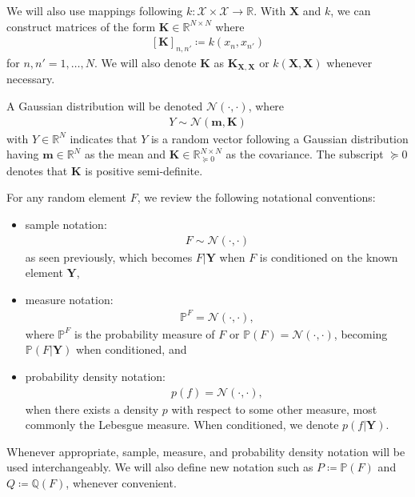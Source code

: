 \documentclass{article}
\numberwithin{equation}{section}
\begin{document}
We will also use mappings following $k: \mathcal{X} \times \mathcal{X} \rightarrow \mathbb{R}$.
With $\mathbf{X}$ and $k$, we can construct matrices of the form $\mathbf{K} \in \mathbb{R}^{N\times N}$ where
\begin{align}
    \left[\mathbf{K}\right]_{n, n'} \coloneqq k(x_n, x_{n'})
\end{align}
for $n, n'=1,\dots,N$. 
We will also denote $\mathbf{K}$ as $\mathbf{K}_{\mathbf{X}, \mathbf{X}}$ or $k\left(\mathbf{X}, \mathbf{X}\right)$ whenever necessary.

A Gaussian distribution will be denoted $\mathcal{N}(\cdot, \cdot)$, where 
\begin{align}
    Y \sim \mathcal{N}(\mathbf{m}, \mathbf{K})
\end{align}
with $Y \in \mathbb{R}^N$ indicates that $Y$ is a random vector following a Gaussian distribution having $\mathbf{m} \in \mathbb{R}^N$ as the mean and $\mathbf{K} \in \mathbb{R}^{N \times N}_{\succcurlyeq 0}$ as the covariance. 
The subscript ${\succcurlyeq 0}$ denotes that $\mathbf{K}$ is positive semi-definite.

For any random element $F$, we review the following notational conventions:
\begin{itemize}
    \setlength\itemsep{-0.25em}
    \item sample notation: 
        \begin{align}
            F \sim \mathcal{N}(\cdot, \cdot)
        \end{align}
        as seen previously, which becomes $F \vert \mathbf{Y}$ when $F$ is conditioned on the known element $\mathbf{Y}$,
    \item measure notation: 
        \begin{align}
            \mathbb{P}^F = \mathcal{N}(\cdot, \cdot),
        \end{align}
        where $\mathbb{P}^F$ is the probability measure of $F$ or $\mathbb{P}(F) = \mathcal{N}(\cdot, \cdot)$, becoming $\mathbb{P}(F \vert \mathbf{Y})$ when conditioned, and
    \item probability density notation: 
        \begin{align}
           p(f) = \mathcal{N}(\cdot, \cdot),
        \end{align}
        when there exists a density $p$ with respect to some other measure, most commonly the Lebesgue measure. 
        When conditioned, we denote $p(f\vert \mathbf{Y})$.
\end{itemize}
Whenever appropriate, sample, measure, and probability density notation will be used interchangeably. 
We will also define new notation such as $P \coloneqq \mathbb{P}(F)$ and $Q \coloneqq \mathbb{Q}(F)$, whenever convenient.
\end{document}
